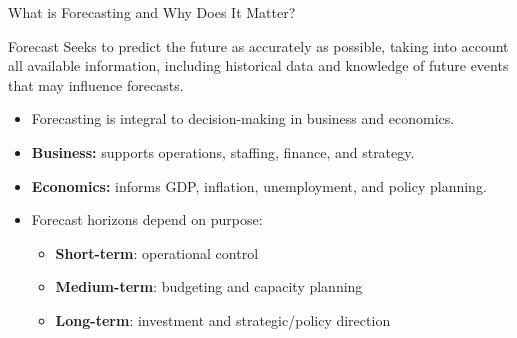 \documentclass[11pt]{beamer}
\begin{document}
\begin{frame}[fragile]{What is Forecasting and Why Does It Matter?}
	\begin{block}{Forecast}
		Seeks to predict the future as accurately as possible, taking into account all available information, including historical data and knowledge of future events that may influence forecasts. \scriptsize{\citet{hyndman2021ForecastingPrinciplesPractice}}
	\end{block}

	\begin{itemize}
		\setlength{\itemsep}{0.25cm}
		\item Forecasting is integral to decision-making in business and economics.
		\item \textbf{Business:} supports operations, staffing, finance, and strategy.
		\item \textbf{Economics:} informs GDP, inflation, unemployment, and policy planning.
		\item Forecast horizons depend on purpose:
		\begin{itemize}
			\item \textbf{Short-term}: operational control
			\item \textbf{Medium-term}: budgeting and capacity planning
			\item \textbf{Long-term}: investment and strategic/policy direction
		\end{itemize}
	\end{itemize}
\end{frame}

\end{document}
